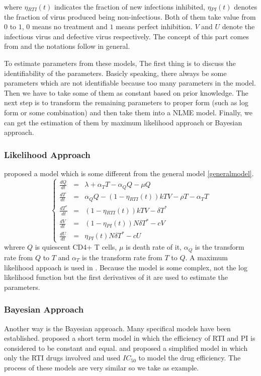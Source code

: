 \documentclass[12pt]{extarticle}
\begin{document}
where $\eta{}_{RTI}(t)$ indicates the fraction of new infections inhibited, $\eta{}_{PI}(t)$ denotes the fraction of virus produced being non-infectious. Both of them take value from $0$ to $1$, $0$ means no treatment and $1$ means perfect inhibition. $V$ and $U$ denote the infectious virus and defective virus respectively. The concept of this part comes from \cite{Putter02} and the notations follow \cite{Huang0601} in general.

To estimate parameters from these models, The first thing is to discuss the identifiability of the parameters. Basicly speaking, there always be some parameters which are not identifiable because too many parameters in the model. Then we have to take some of them as constant based on prior knowledge. The next step is to transform the remaining parameters to proper form (such as log form or some combination) and then take them into a NLME model. Finally, we can get the estimation of them by maximum likelihood approach or Bayesian approach.
\subsubsection{Likelihood Approach}
\label{sect:likelihoodapproach}
\cite{Guedj07} proposed a model which is some different from the general model \eqref{generalmodel}.
\begin{equation}
\left\{
\begin{array}{rcl}
\frac{dQ}{dt} & = & \lambda{}+\alpha{}_{T}T-\alpha{}_{Q}Q-\mu{}Q \\
\frac{dT}{dt} & = & \alpha{}_{Q}Q-(1-\eta{}_{RTI}(t))kTV-\rho{}T-\alpha{}_{T}T \\
\frac{dT^{*}}{dt} & = & (1-\eta{}_{RTI}(t))kTV-\delta{}T^{*} \\
\frac{dV}{dt} & = & (1-\eta{}_{PI}(t))N\delta{}T^{*}-cV \\
\frac{dU}{dt} & = & \eta{}_{PI}(t)N\delta{}T^{*}-cU
\end{array}
\right.
\end{equation}
whrere $Q$ is quiescent CD4+ T cells, $\mu{}$ is death rate of it, $\alpha{}_Q$ is the transform rate from $Q$ to $T$ and $\alpha{}_T$ is the transform rate from $T$ to $Q$.
A maximum likelihood appoach is used in \cite{Guedj07}. Because the model is some complex, not the log likelihood function but the first derivatives of it are used to estimate the parameters. 
\subsubsection{Bayesian Approach}
\label{sect:bayesianapproach}
Another way is the Bayesian approach. Many specifical models have been established. \cite{Putter02} proposed a short term model in which the efficiency of RTI and PI is considered to be constant and equal. \cite{Huang0601} and \cite{Huang0602} proposed a simplified model in which only the RTI drugs involved and used $IC_{50}$ to model the drug efficiency. The process of these models are very similar so we take \cite{Huang0601} as example.
\end{document}
